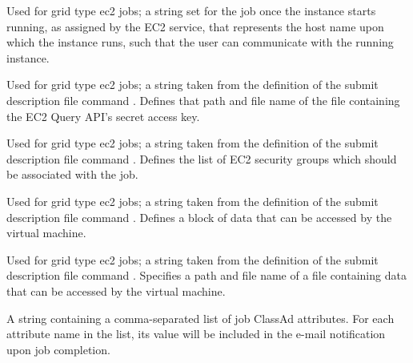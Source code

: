 \begin{description}
\item[\AdAttr{EC2RemoteVirtualMachineName}:] 
Used for grid type ec2 jobs;
a string set for the job once the instance starts running, 
as assigned by the EC2 service, that represents
the host name upon which the instance runs, such that the
user can communicate with the running instance.

\item[\AdAttr{EC2SecretAccessKey}:] 
Used for grid type ec2 jobs;
a string taken from the definition of the submit description file command
.
Defines that path and file name of the file 
containing the EC2 Query API's secret access key.

\item[\AdAttr{EC2SecurityGroups}:] 
Used for grid type ec2 jobs;
a string taken from the definition of the submit description file command
.
Defines the list of EC2 security groups which should be associated with the job.

\item[\AdAttr{EC2UserData}:] 
Used for grid type ec2 jobs;
a string taken from the definition of the submit description file command
.
Defines a block of data that can be accessed by the virtual machine.

\item[\AdAttr{EC2UserDataFile}:] 
Used for grid type ec2 jobs;
a string taken from the definition of the submit description file command
.
Specifies a path and file name of a file containing 
data that can be accessed by the virtual machine.

\item[\AdAttr{EmailAttributes}:]  A string containing a comma-separated
list of job ClassAd attributes. For each attribute name in the list,
its value will be included in the e-mail notification upon job completion.


\end{description}
